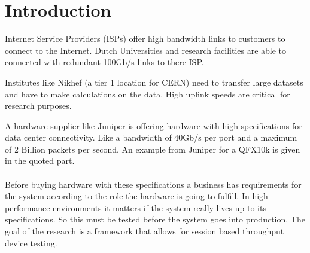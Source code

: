 \section{Introduction}
Internet Service Providers (ISPs) offer high bandwidth links to customers to connect to the Internet. Dutch Universities and research facilities are able to connected with redundant 100Gb/s links to there ISP. 

Institutes like Nikhef (a tier 1 location for CERN) need to transfer large datasets and have to make calculations on the data. High uplink speeds are critical for research purposes. 

A hardware supplier like Juniper is offering hardware with high specifications for data center connectivity. Like a bandwidth of 40Gb/s per port and a maximum of 2 Billion packets per second. An example from Juniper for a QFX10k is given in the quoted part. \\ 

 \\

Before buying hardware with these specifications a business has requirements for the system according to the role the hardware is going to fulfill. 
In high performance environments it matters if the system really lives up to its specifications. So this must be tested before the system goes into production. The goal of the research is a framework that allows for session based throughput device testing. 
